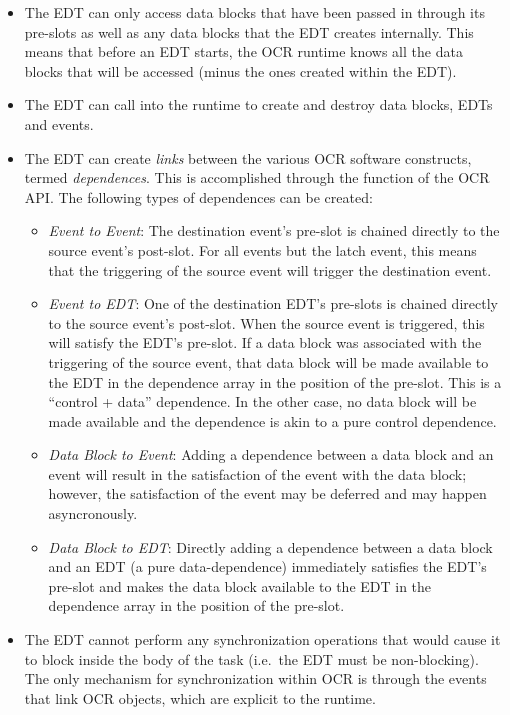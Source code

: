 \begin{itemize}
\item The EDT can only access data blocks that have been passed in
through its pre-slots as well as any data blocks that the EDT creates
internally. This means that before an EDT starts, the OCR runtime
knows all the data blocks that will be accessed (minus the ones
created within the EDT).

\item The EDT can call into the runtime to create and destroy data
blocks, EDTs and events.

\item The EDT can create \emph{links} between the various OCR
software constructs, termed \emph{dependences}. This is
accomplished through the  function of the OCR
API. The following types of dependences can be created:
\begin{itemize}
\item \emph{Event to Event}: The destination event’s pre-slot is chained
directly to the source event’s post-slot.
For all events but the latch event, this means that the triggering of
the source event will trigger the destination event.

\item \emph{Event to EDT}: One of the destination EDT’s pre-slots is chained
directly to the source event’s post-slot. When the source event is
triggered, this will satisfy the EDT’s pre-slot. If a data block was
associated with the triggering of the source event, that data block
will be made available to the EDT in the dependence array in the
position of the pre-slot. This is a “control + data” dependence. In
the other case, no data block will be made available and the
dependence is akin to a pure control dependence.

\item \emph{Data Block to Event}: Adding a dependence between a data block and an
event will result in the satisfaction of the event with the data block;
however, the satisfaction of the event may be deferred and may happen asyncronously.

\item \emph{Data Block to EDT}: Directly adding a dependence between a data block and
an EDT (a pure data-dependence) immediately satisfies the EDT’s
pre-slot and makes the data block available to the EDT in the
dependence array in the position of the pre-slot.
\end{itemize}

\item The EDT cannot perform any synchronization operations that would
cause it to block inside the body of the task (i.e.\ the EDT must be
non-blocking). The only mechanism for synchronization within OCR is
through the events that link OCR objects, which are explicit to the
runtime.
\end{itemize}

